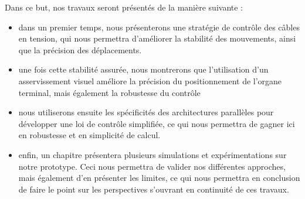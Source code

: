 Dans ce but, nos travaux seront pr\'esent\'es de la mani\`ere suivante : 
\begin{itemize}
 \item dans un premier temps, nous pr\'esenterons une strat\'egie de contr\^ole
des c\^ables en tension, qui nous permettra d'am\'eliorer la stabilit\'e des
mouvements, ainsi que la pr\'ecision des d\'eplacements.
 \item une fois cette stabilit\'e assur\'ee, nous montrerons que l'utilisation
d'un asservissement visuel am\'eliore la pr\'ecision du positionnement de
l'organe terminal, mais \'egalement la robustesse du contr\^ole
 \item nous utiliserons ensuite les sp\'ecificit\'es des architectures
parall\`eles pour d\'evelopper une loi de contr\^ole simplifi\'ee, ce qui nous
permettra de gagner ici en robustesse et en simplicit\'e de calcul.
 \item enfin, un chapitre pr\'esentera plusieurs simulations et
exp\'erimentations sur notre prototype. Ceci nous permettra de valider nos
diff\'erentes approches, mais \'egalement d'en pr\'esenter les limites, ce qui
nous permettra en conclusion de faire le point sur les perspectives s'ouvrant
en continuit\'e de ces travaux.
\end{itemize}




